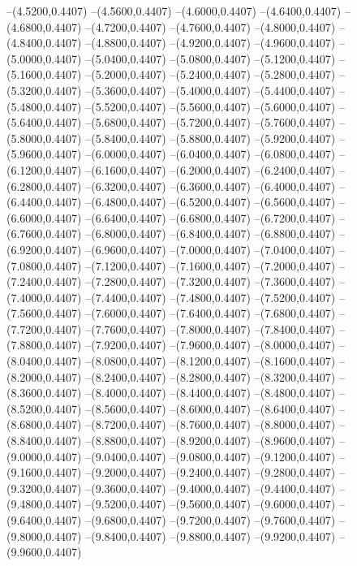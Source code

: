 {	--(4.5200,0.4407)
	--(4.5600,0.4407)
	--(4.6000,0.4407)
	--(4.6400,0.4407)
	--(4.6800,0.4407)
	--(4.7200,0.4407)
	--(4.7600,0.4407)
	--(4.8000,0.4407)
	--(4.8400,0.4407)
	--(4.8800,0.4407)
	--(4.9200,0.4407)
	--(4.9600,0.4407)
	--(5.0000,0.4407)
	--(5.0400,0.4407)
	--(5.0800,0.4407)
	--(5.1200,0.4407)
	--(5.1600,0.4407)
	--(5.2000,0.4407)
	--(5.2400,0.4407)
	--(5.2800,0.4407)
	--(5.3200,0.4407)
	--(5.3600,0.4407)
	--(5.4000,0.4407)
	--(5.4400,0.4407)
	--(5.4800,0.4407)
	--(5.5200,0.4407)
	--(5.5600,0.4407)
	--(5.6000,0.4407)
	--(5.6400,0.4407)
	--(5.6800,0.4407)
	--(5.7200,0.4407)
	--(5.7600,0.4407)
	--(5.8000,0.4407)
	--(5.8400,0.4407)
	--(5.8800,0.4407)
	--(5.9200,0.4407)
	--(5.9600,0.4407)
	--(6.0000,0.4407)
	--(6.0400,0.4407)
	--(6.0800,0.4407)
	--(6.1200,0.4407)
	--(6.1600,0.4407)
	--(6.2000,0.4407)
	--(6.2400,0.4407)
	--(6.2800,0.4407)
	--(6.3200,0.4407)
	--(6.3600,0.4407)
	--(6.4000,0.4407)
	--(6.4400,0.4407)
	--(6.4800,0.4407)
	--(6.5200,0.4407)
	--(6.5600,0.4407)
	--(6.6000,0.4407)
	--(6.6400,0.4407)
	--(6.6800,0.4407)
	--(6.7200,0.4407)
	--(6.7600,0.4407)
	--(6.8000,0.4407)
	--(6.8400,0.4407)
	--(6.8800,0.4407)
	--(6.9200,0.4407)
	--(6.9600,0.4407)
	--(7.0000,0.4407)
	--(7.0400,0.4407)
	--(7.0800,0.4407)
	--(7.1200,0.4407)
	--(7.1600,0.4407)
	--(7.2000,0.4407)
	--(7.2400,0.4407)
	--(7.2800,0.4407)
	--(7.3200,0.4407)
	--(7.3600,0.4407)
	--(7.4000,0.4407)
	--(7.4400,0.4407)
	--(7.4800,0.4407)
	--(7.5200,0.4407)
	--(7.5600,0.4407)
	--(7.6000,0.4407)
	--(7.6400,0.4407)
	--(7.6800,0.4407)
	--(7.7200,0.4407)
	--(7.7600,0.4407)
	--(7.8000,0.4407)
	--(7.8400,0.4407)
	--(7.8800,0.4407)
	--(7.9200,0.4407)
	--(7.9600,0.4407)
	--(8.0000,0.4407)
	--(8.0400,0.4407)
	--(8.0800,0.4407)
	--(8.1200,0.4407)
	--(8.1600,0.4407)
	--(8.2000,0.4407)
	--(8.2400,0.4407)
	--(8.2800,0.4407)
	--(8.3200,0.4407)
	--(8.3600,0.4407)
	--(8.4000,0.4407)
	--(8.4400,0.4407)
	--(8.4800,0.4407)
	--(8.5200,0.4407)
	--(8.5600,0.4407)
	--(8.6000,0.4407)
	--(8.6400,0.4407)
	--(8.6800,0.4407)
	--(8.7200,0.4407)
	--(8.7600,0.4407)
	--(8.8000,0.4407)
	--(8.8400,0.4407)
	--(8.8800,0.4407)
	--(8.9200,0.4407)
	--(8.9600,0.4407)
	--(9.0000,0.4407)
	--(9.0400,0.4407)
	--(9.0800,0.4407)
	--(9.1200,0.4407)
	--(9.1600,0.4407)
	--(9.2000,0.4407)
	--(9.2400,0.4407)
	--(9.2800,0.4407)
	--(9.3200,0.4407)
	--(9.3600,0.4407)
	--(9.4000,0.4407)
	--(9.4400,0.4407)
	--(9.4800,0.4407)
	--(9.5200,0.4407)
	--(9.5600,0.4407)
	--(9.6000,0.4407)
	--(9.6400,0.4407)
	--(9.6800,0.4407)
	--(9.7200,0.4407)
	--(9.7600,0.4407)
	--(9.8000,0.4407)
	--(9.8400,0.4407)
	--(9.8800,0.4407)
	--(9.9200,0.4407)
	--(9.9600,0.4407)
}
